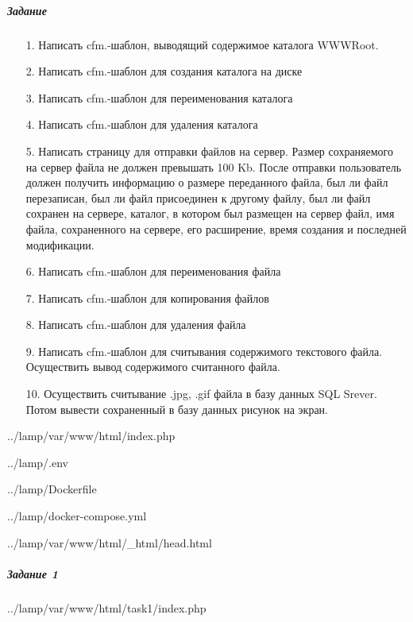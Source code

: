 \subparagraph{Задание} \hspace{0pt}

\begin{itemize}
    \item[1.] Написать cfm.-шаблон, выводящий содержимое каталога WWWRoot.
    \item[2.] Написать cfm.-шаблон для создания каталога на диске
    \item[3.] Написать cfm.-шаблон для переименования каталога
    \item[4.] Написать cfm.-шаблон для удаления каталога
    \item[5.] Написать страницу для отправки файлов на сервер.
    Размер сохраняемого на сервер файла не должен превышать 100 Kb.
    После отправки пользователь должен получить информацию о размере
    переданного файла, был ли файл перезаписан,
    был ли файл присоединен к другому файлу,
    был ли файл сохранен на сервере, каталог,
    в котором был размещен на сервер файл, имя файла,
    сохраненного на сервере, его расширение,
    время создания и последней модификации.
    \item[6.] Написать cfm.-шаблон для переименования файла 
    \item[7.] Написать cfm.-шаблон для копирования файлов
    \item[8.] Написать cfm.-шаблон для удаления файла
    \item[9.] Написать cfm.-шаблон для считывания содержимого текстового файла.
    Осуществить вывод содержимого считанного файла.
    \item[10.] Осуществить считывание .jpg, .gif файла в базу данных SQL Srever.
    Потом вывести сохраненный в базу данных рисунок на экран.
\end{itemize}


{../lamp/var/www/html/index.php}


{../lamp/.env}


{../lamp/Dockerfile}


{../lamp/docker-compose.yml}


{../lamp/var/www/html/_html/head.html}


\subparagraph{Задание 1} \hspace{0pt}


{../lamp/var/www/html/task1/index.php}

